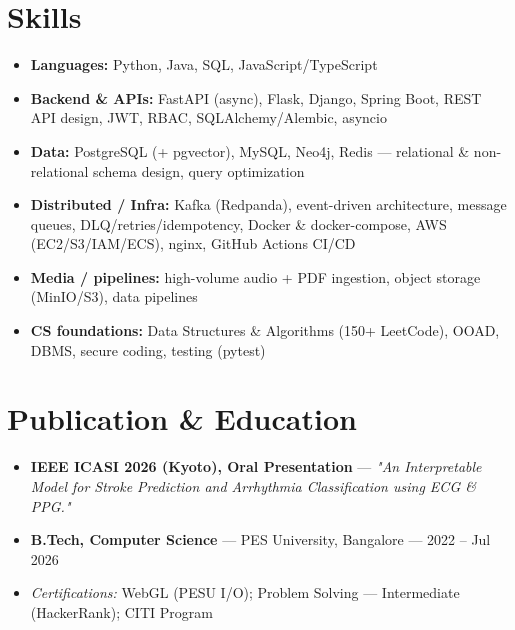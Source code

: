 \documentclass[10pt,a4paper]{article}
\begin{document}
\section*{Skills}
\begin{itemize}
\item \textbf{Languages:} Python, Java, SQL, JavaScript/TypeScript
\item \textbf{Backend \& APIs:} FastAPI (async), Flask, Django, Spring Boot, REST API design, JWT, RBAC, SQLAlchemy/Alembic, asyncio
\item \textbf{Data:} PostgreSQL (+ pgvector), MySQL, Neo4j, Redis --- relational \& non-relational schema design, query optimization
\item \textbf{Distributed / Infra:} Kafka (Redpanda), event-driven architecture, message queues, DLQ/retries/idempotency, Docker \& docker-compose, AWS (EC2/S3/IAM/ECS), nginx, GitHub Actions CI/CD
\item \textbf{Media / pipelines:} high-volume audio + PDF ingestion, object storage (MinIO/S3), data pipelines
\item \textbf{CS foundations:} Data Structures \& Algorithms (150+ LeetCode), OOAD, DBMS, secure coding, testing (pytest)
\end{itemize}
\section*{Publication \& Education}
\begin{itemize}
\item \textbf{IEEE ICASI 2026 (Kyoto), Oral Presentation} --- \textit{"An Interpretable Model for Stroke Prediction and Arrhythmia Classification using ECG \& PPG."}
\item \textbf{B.Tech, Computer Science} --- PES University, Bangalore --- 2022 -- Jul 2026
\item \textit{Certifications:} WebGL (PESU I/O); Problem Solving --- Intermediate (HackerRank); CITI Program
\end{itemize}
\end{document}

